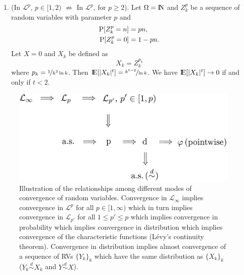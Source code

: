 \documentclass[a4paper,10pt]{article}
\begin{document}
\begin{enumerate}
 \item (In $\mathcal{L}^p$, $p\in[1,2)$ $\not\Rightarrow$ In $\mathcal{L}^p$, for $p\geq 2$).
       Let $\Omega=\N$ and $Z_k^p$ be a sequence of random variables with parameter $p$ and 
       \begin{align*}
        \mathrm{P}[Z_k^p=n] &= pn,\\
        \mathrm{P}[Z_k^p=0] &= 1-pn.
       \end{align*}
       Let $X=0$ and $X_k$ be defined as
       \[
        X_k = Z_{k}^{p_k}
       \]
       where $p_k=\nicefrac{1}{k^2 \ln k}$. 
       Then $\E[|X_k|^t]=\nicefrac{k^{t-2}}{\ln k}$. 
       We have $\E[|X_k|^t]\to 0$ if and only if $t<2$.
\end{enumerate}
\begin{figure}
 \centering
 \includegraphics[width=0.6\linewidth]{figures/convergence_rv}
 \caption{Illustration of the relationships among different modes of convergence of random variables. 
         Convergence in $\mathcal{L}_\infty$ implies convergence in $\mathcal{L}^p$ for all $p\in[1,\infty)$
         which in turn implies convergence in $\mathcal{L}_{p'}$ for all $1\leq p' \leq p$ which implies 
         convergence in probability which implies convergence in distribution which implies 
         convergence of the characteristic functions (L\'evy's continuity theorem). 
         Convergence in distribution implies almost 
         convergence of a sequence of RVs $\{Y_k\}_k$ which have the same distribution as 
         $\{X_k\}_k$ ($Y_k \overset{d}{\sim} X_k$ and $Y \overset{d}{\sim} X$).
         }
\end{figure}
\end{document}
